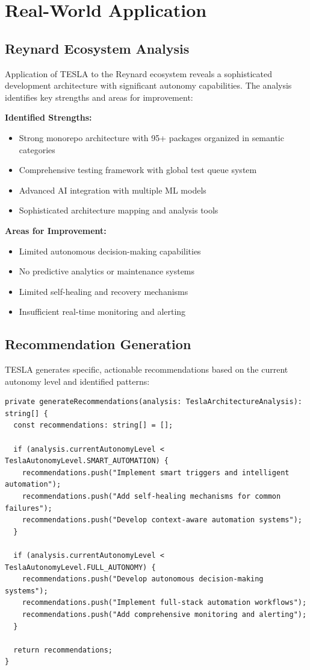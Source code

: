 \documentclass[10pt]{article}
\begin{document}
\section{Real-World Application}

\subsection{Reynard Ecosystem Analysis}

Application of TESLA to the Reynard ecosystem reveals a sophisticated development architecture with significant autonomy capabilities. The analysis identifies key strengths and areas for improvement:

\textbf{Identified Strengths:}
\begin{itemize}
    \item Strong monorepo architecture with 95+ packages organized in semantic categories
    \item Comprehensive testing framework with global test queue system
    \item Advanced AI integration with multiple ML models
    \item Sophisticated architecture mapping and analysis tools
\end{itemize}

\textbf{Areas for Improvement:}
\begin{itemize}
    \item Limited autonomous decision-making capabilities
    \item No predictive analytics or maintenance systems
    \item Limited self-healing and recovery mechanisms
    \item Insufficient real-time monitoring and alerting
\end{itemize}

\subsection{Recommendation Generation}

TESLA generates specific, actionable recommendations based on the current autonomy level and identified patterns:

\begin{lstlisting}[caption={TESLA Recommendation Engine}]
private generateRecommendations(analysis: TeslaArchitectureAnalysis): string[] {
  const recommendations: string[] = [];
  
  if (analysis.currentAutonomyLevel < TeslaAutonomyLevel.SMART_AUTOMATION) {
    recommendations.push("Implement smart triggers and intelligent automation");
    recommendations.push("Add self-healing mechanisms for common failures");
    recommendations.push("Develop context-aware automation systems");
  }
  
  if (analysis.currentAutonomyLevel < TeslaAutonomyLevel.FULL_AUTONOMY) {
    recommendations.push("Develop autonomous decision-making systems");
    recommendations.push("Implement full-stack automation workflows");
    recommendations.push("Add comprehensive monitoring and alerting");
  }
  
  return recommendations;
}
\end{lstlisting}
\end{document}
